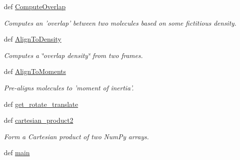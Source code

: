 \begin{DoxyCompactItemize}
def \hyperlink{namespaceforcebalance_1_1molecule_a8fcbb4a2b3470a85d25699b6f28a54fc}{Compute\-Overlap}
\begin{DoxyCompactList}\small\item\em Computes an 'overlap' between two molecules based on some fictitious density. \end{DoxyCompactList}\item 
def \hyperlink{namespaceforcebalance_1_1molecule_a9a58eb1746e51420f50da3f3a6d51485}{Align\-To\-Density}
\begin{DoxyCompactList}\small\item\em Computes a \char`\"{}overlap density\char`\"{} from two frames. \end{DoxyCompactList}\item 
def \hyperlink{namespaceforcebalance_1_1molecule_aa9ad9b92efa7bd3c1d589d62bbb8108e}{Align\-To\-Moments}
\begin{DoxyCompactList}\small\item\em Pre-\/aligns molecules to 'moment of inertia'. \end{DoxyCompactList}\item 
def \hyperlink{namespaceforcebalance_1_1molecule_a08840b73e95bf34bf9ca7ea36ad0492d}{get\-\_\-rotate\-\_\-translate}
\item 
def \hyperlink{namespaceforcebalance_1_1molecule_ae76fc5d05f43acc6006a4d1733818d71}{cartesian\-\_\-product2}
\begin{DoxyCompactList}\small\item\em Form a Cartesian product of two Num\-Py arrays. \end{DoxyCompactList}\item 
def \hyperlink{namespaceforcebalance_1_1molecule_ab9cb167fbbd809aedcf8c7434d405547}{main}
\end{DoxyCompactItemize}
